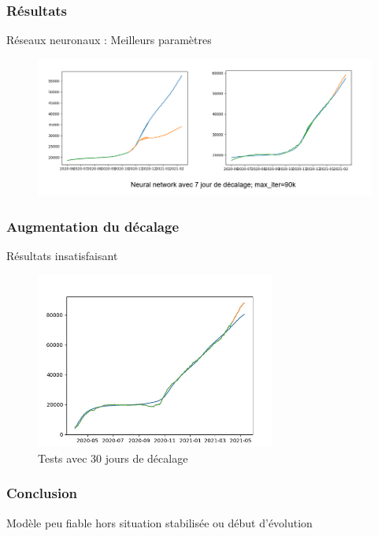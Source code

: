 \documentclass{beamer}
\begin{document}
\begin{frame}
	\frametitle{Résultats}
	Réseaux neuronaux : Meilleurs paramètres
	\begin{figure}
		\includegraphics[scale=0.6]{NN_3}
	\end{figure}
\end{frame}

\begin{frame}
	\frametitle{Augmentation du décalage}
	Résultats insatisfaisant 
	\begin{figure}
		\includegraphics[width=0.7\textwidth]{NN_2}
		\caption{Tests avec 30 jours de décalage}
	\end{figure}
\end{frame}

\begin{frame}
	\frametitle{Conclusion}
	Modèle peu fiable hors situation stabilisée ou début d'évolution
\end{frame}

\appendix




\end{document}
